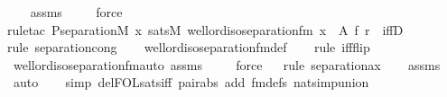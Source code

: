 \begin{isabellebody}
\ \ \isamarkupfalse%
\ assms\isanewline
\ \ \ \isamarkupfalse%
\ force\isanewline
\ \ \isamarkupfalse%
{\isacharparenleft}{\kern0pt}rule{\isacharunderscore}{\kern0pt}tac\ P{\isacharequal}{\kern0pt}{\isachardoublequoteopen}separation{\isacharparenleft}{\kern0pt}{\isacharhash}{\kern0pt}{\isacharhash}{\kern0pt}M{\isacharcomma}{\kern0pt}\ {\isasymlambda}x{\isachardot}{\kern0pt}\ sats{\isacharparenleft}{\kern0pt}M{\isacharcomma}{\kern0pt}\ well{\isacharunderscore}{\kern0pt}ord{\isacharunderscore}{\kern0pt}iso{\isacharunderscore}{\kern0pt}separation{\isacharunderscore}{\kern0pt}fm{\isacharcomma}{\kern0pt}\ {\isacharbrackleft}{\kern0pt}x{\isacharbrackright}{\kern0pt}\ {\isacharat}{\kern0pt}\ {\isacharbrackleft}{\kern0pt}A{\isacharcomma}{\kern0pt}\ f{\isacharcomma}{\kern0pt}\ r{\isacharbrackright}{\kern0pt}{\isacharparenright}{\kern0pt}{\isacharparenright}{\kern0pt}{\isachardoublequoteclose}\ \ iffD{}{\isacharparenright}{\kern0pt}\isanewline
\ \ \isamarkupfalse%
{\isacharparenleft}{\kern0pt}rule\ separation{\isacharunderscore}{\kern0pt}cong{\isacharparenright}{\kern0pt}\isanewline
\ \ \isamarkupfalse%
\ well{\isacharunderscore}{\kern0pt}ord{\isacharunderscore}{\kern0pt}iso{\isacharunderscore}{\kern0pt}separation{\isacharunderscore}{\kern0pt}fm{\isacharunderscore}{\kern0pt}def\isanewline
\ \ \ \isamarkupfalse%
{\isacharparenleft}{\kern0pt}rule\ iff{\isacharunderscore}{\kern0pt}flip{\isacharparenright}{\kern0pt}\isanewline
\ \ \isamarkupfalse%
\ well{\isacharunderscore}{\kern0pt}ord{\isacharunderscore}{\kern0pt}iso{\isacharunderscore}{\kern0pt}separation{\isacharunderscore}{\kern0pt}fm{\isacharunderscore}{\kern0pt}auto\ assms\isanewline
\ \ \ \isamarkupfalse%
\ force\isanewline
\ \ \isamarkupfalse%
{\isacharparenleft}{\kern0pt}rule\ separation{\isacharunderscore}{\kern0pt}ax{\isacharparenright}{\kern0pt}\isanewline
\ \ \isamarkupfalse%
\ assms\isanewline
\ \ \isamarkupfalse%
\ auto{\isacharbrackleft}{\kern0pt}{}{\isacharbrackright}{\kern0pt}\isanewline
\ \ \isamarkupfalse%
\ {\isacharparenleft}{\kern0pt}simp\ del{\isacharcolon}{\kern0pt}FOL{\isacharunderscore}{\kern0pt}sats{\isacharunderscore}{\kern0pt}iff\ pair{\isacharunderscore}{\kern0pt}abs\ add{\isacharcolon}{\kern0pt}\ fm{\isacharunderscore}{\kern0pt}defs\ nat{\isacharunderscore}{\kern0pt}simp{\isacharunderscore}{\kern0pt}union{\isacharparenright}{\kern0pt}\isanewline

\end{isabellebody}
